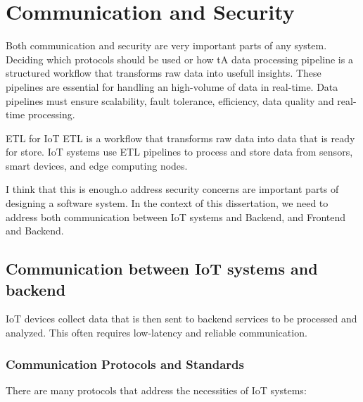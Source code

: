 \section{Communication and Security}
Both communication and security are very important parts of any system.
Deciding which protocols should be used or how tA data processing pipeline is a structured workflow that transforms raw data
into usefull insights. These pipelines are essential for handling an high-volume
of data in real-time. Data pipelines must ensure scalability, fault tolerance,
efficiency, data quality and real-time processing.

ETL for IoT
ETL is a workflow that transforms raw data into data that is ready for
store. IoT systems use ETL pipelines to process and store data from sensors,
smart devices, and edge computing nodes.

I think that this is enough.o address security concerns are
important parts of designing a software system. In the context of this
dissertation, we need to address both communication between IoT systems and
Backend, and Frontend and Backend.


\subsection{Communication between IoT systems and backend}
IoT devices collect data that is then sent to backend services to be processed
and analyzed. This often requires low-latency and reliable communication.
\subsubsection{Communication Protocols and Standards}
There are many protocols that address the necessities of IoT systems:

